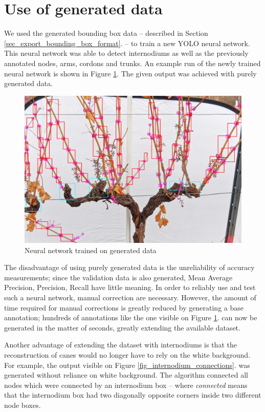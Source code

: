 \documentclass{PSAIE}%
\begin{document}
\section{Use of generated data} \label{sec_use_of_generated_data}
We used the generated bounding box data -- described in Section \ref{sec_export_bounding_box_format}. --
to train a new YOLO neural network. This neural network was able to detect internodiums as well as the
previously annotated nodes, arms, cordons and trunks. An example run of the newly trained neural network
is shown in Figure \ref{fig_generated_data_train}. The given output was achieved with purely generated
data.

\begin{figure}[h]
      \centering
      \includegraphics[scale=0.23]{images/generated_train_data.png}
      \caption{Neural network trained on generated data}
      \label{fig_generated_data_train}
\end{figure}

The disadvantage of using purely generated data is the unreliability of accuracy measurements; since the
validation data is also generated, Mean Average Precision, Precision, Recall have little meaning. In order
to reliably use and test such a neural network, manual correction are necessary. However, the amount of time
required for manual corrections is greatly reduced by generating a base annotation; hundreds of annotations
like the one visible on Figure \ref{fig_generated_data_train}. can now be generated in the matter of seconds,
greatly extending the available dataset.

Another advantage of extending the dataset with internodiums is that the reconstruction of canes
would no longer have to rely on the white background. For example, the output visible on Figure
\ref{fig_internodium_connections}. was generated without reliance on white background. The algorithm
connected all nodes which were connected by an internodium box -- where \textit{connected} means that the
internodium box had two diagonally opposite corners inside two different node boxes.
\end{document}

